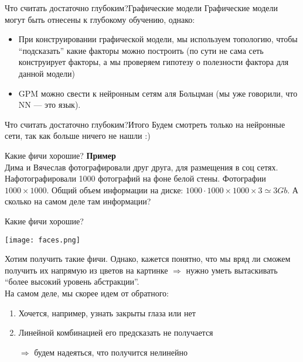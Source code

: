 \documentclass[14pt, fleqn, xcolor={dvipsnames, table}]{beamer}
\begin{document}
\begin{frame}{Что считать достаточно глубоким?}{Графические модели}
\small
Графические модели могут быть отнесены к глубокому обучению, однако:
\begin{itemize}
  \item При конструировании графической модели, мы используем топологию, чтобы ``подсказать'' какие факторы можно построить (по сути не сама сеть конструирует факторы, а мы проверяем гипотезу о полезности фактора для данной модели)
  \item GPM можно свести к нейронным сетям аля Больцман (мы уже говорили, что NN --- это язык).
\end{itemize}
\end{frame}

\begin{frame}{Что считать достаточно глубоким?}{Итого}\Large
Будем смотреть только на нейронные сети, так как больше ничего не нашли :)
\end{frame}

\begin{frame}{Какие фичи хорошие?}
\small
\textbf{Пример}\\
Дима и Вячеслав фотографировали друг друга, для размещения в соц сетях. Нафотографировали 1000 фотографий на фоне белой стены. Фотографии $1000\times1000$. Общий объем информации на диске: $1000\cdot1000\times1000\times3 \simeq 3Gb$. А сколько на самом деле там информации?
\end{frame}

\begin{frame}{Какие фичи хорошие?}
\begin{center}\texttt{[image: faces.png]}\end{center}
\small
Хотим получить такие фичи. Однако, кажется понятно, что мы вряд ли сможем получить их напрямую из цветов на картинке $\Rightarrow$ нужно уметь вытаскивать ``более высокий уровень абстракции''.\\
На самом деле, мы скорее идем от обратного:
\begin{enumerate}
  \item Хочется, например, узнать закрыты глаза или нет
  \item Линейной комбинацией его предсказать не получается
  \item[$\Rightarrow$] будем надеяться, что получится нелинейно
\end{enumerate}
\end{frame}
\end{document}
